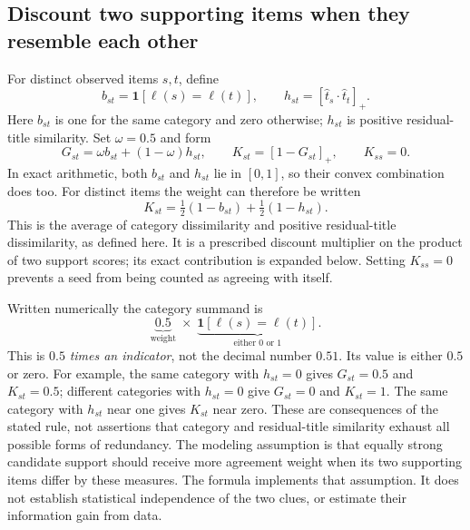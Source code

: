 \documentclass[11pt,a4paper]{article}
\numberwithin{equation}{section}
\begin{document}
\subsection{Discount two supporting items when they resemble each other}
For distinct observed items $s,t$, define
\begin{equation}
 b_{st}=\mathbf1[\ell(s)=\ell(t)],\qquad
 h_{st}=[\widehat t_s\cdot\widehat t_t]_+.
\end{equation}
Here $b_{st}$ is one for the same category and zero otherwise; $h_{st}$ is
positive residual-title similarity. Set $\omega=0.5$ and form
\begin{equation}
 G_{st}=\omega b_{st}+(1-\omega)h_{st},\qquad
 K_{st}=[1-G_{st}]_+,\qquad K_{ss}=0.
\end{equation}
In exact arithmetic, both $b_{st}$ and $h_{st}$ lie in $[0,1]$, so their convex
combination does too. For distinct items the weight can therefore be written
\begin{equation}
 \boxed{K_{st}=\tfrac12(1-b_{st})+\tfrac12(1-h_{st}).}
\end{equation}
This is the average of category dissimilarity and positive residual-title
dissimilarity, as defined here. It is a prescribed discount multiplier on the
product of two support scores; its exact contribution is expanded below.
Setting $K_{ss}=0$ prevents a seed from being counted as agreeing with itself.

Written numerically the category summand is
\[
 \underbrace{0.5}_{\text{weight}}\;\times\;
 \underbrace{\mathbf1[\ell(s)=\ell(t)]}_{\text{either 0 or 1}}.
\]
This is $0.5$ \emph{times an indicator}, not the decimal number $0.51$.
Its value is either $0.5$ or zero.
For example, the same category with $h_{st}=0$ gives $G_{st}=0.5$ and
$K_{st}=0.5$; different categories with $h_{st}=0$ give $G_{st}=0$ and
$K_{st}=1$. The same category with $h_{st}$ near one gives $K_{st}$ near zero.
These are consequences of the stated rule, not assertions that category and
residual-title similarity exhaust all possible forms of redundancy.
The modeling assumption is that equally strong candidate support should receive
more agreement weight when its two supporting items differ by these measures.
The formula implements that assumption. It does not establish statistical
independence of the two clues, or estimate their information gain from data.
\end{document}
